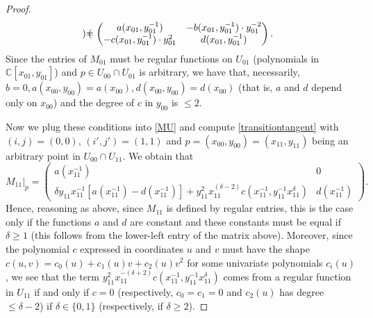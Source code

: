 \documentclass{amsart} %
\theoremstyle{definition}
\begin{document}
\begin{proof}
\begin{equation}
\begin{pmatrix}
           \end{pmatrix}$$ $$ =
        \begin{pmatrix}
               a(x_{01},y_{01}^{-1}) & -b(x_{01},y_{01}^{-1})\cdot y_{01}^{-2} \\
          - c(x_{01},y_{01}^{-1})\cdot y_{01}^2 & d(x_{01},y_{01}^{-1})
        \end{pmatrix}.
\end{equation}
Since the entries of $M_{01}$ must be regular functions on $U_{01}$ (polynomials in $\mathbb{C}[x_{01},y_{01}]$)
and $p\in U_{00}\cap U_{01}$ is arbitrary, we have that, necessarily,
$b=0, a(x_{00},y_{00})=a(x_{00}), d(x_{00},y_{00})=d(x_{00}) $ (that is, $a$ and $d$ depend only on $x_{00}$)
and the degree of $c$ in $ y_{00} $ is $ \leq 2 $.

Now we plug these conditions into \eqref{MU}
and compute \eqref{transitiontangent} with $(i,j)=(0,0)$, $(i',j')=(1,1)$ and $p=(x_{00},y_{00})=(x_{11},y_{11})$
being an arbitrary point in $U_{00}\cap U_{11}$. We obtain that
\begin{equation}\label{11}
M_{11}\vert_p =         \begin{pmatrix}
          a(x_{11}^{-1}) & 0 \\
          \delta y_{11} x_{11}^{-1}[a(x_{11}^{-1}) - d(x_{11}^{-1}) ] + y_{11}^2 x_{11}^{(\delta - 2)} c(x_{11}^{-1}, y_{11}^{-1} x_{11}^{\delta}) & d(x_{11}^{-1})
        \end{pmatrix}.
\end{equation}
Hence, reasoning as above, since $ M_{11} $ is defined by regular entries,
this is the case only if the functions $ a $ and $ d $ are constant and
these constants must be equal if $ \delta \geq 1 $ (this follows from the
lower-left entry of the matrix above).
 Moreover, since the polynomial $c$ expressed in coordinates $u$ and $v$ must have the shape
 $ c(u,v) = c_0(u) + c_1(u) v + c_2(u) v^2 $ for some univariate polynomials $ c_i(u) $,
 we see that the term $y_{11}^2 x_{11}^{-(\delta + 2)} c(x_{11}^{-1}, y_{11}^{-1} x_{11}^{\delta})$ comes
 from a regular function in $U_{11}$ if and only if $ c = 0 $ (respectively, $ c_0 = c_1 = 0 $ and
 $ c_2(u) $ has degree $ \leq \delta - 2 $) if $ \delta \in \{0, 1\}$ (respectively, if $ \delta \geq 2 $).


\end{proof}
\end{document}
